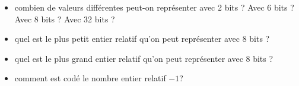 \documentclass[11pt, a4paper]{report}
\begin{document}
\bigskip



\begin{exercice_cours}

    \begin{itemize}
        \item combien de valeurs différentes peut-on représenter avec 2 bits ? Avec 6 bits ? Avec 8 bits ? Avec 32 bits ? 
        \item quel est le plus petit entier relatif qu'on peut représenter avec 8 bits ? \hfill{}
        \item quel est le plus grand entier relatif qu'on peut représenter avec 8 bits ? \hfill{}
        \item comment est codé le nombre entier relatif $-1$? \hfill{}
    \end{itemize}

\end{exercice_cours}

\medskip
\end{document}
